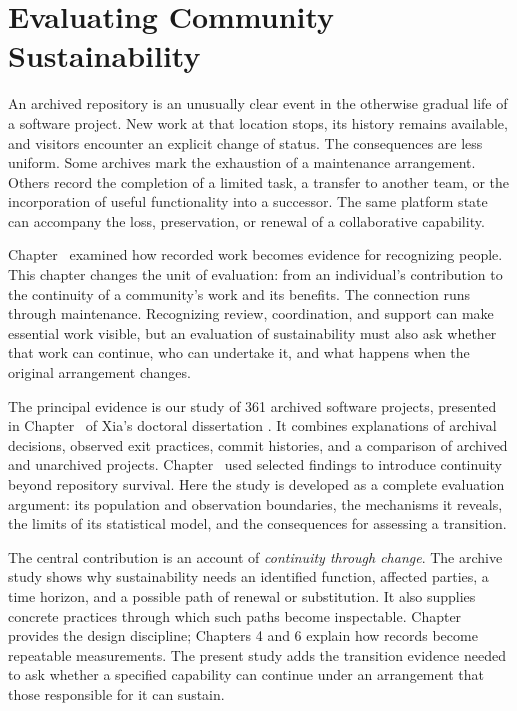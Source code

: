 \chapter{Evaluating Community Sustainability}
\label{ch:sustainability}

An archived repository is an unusually clear event in the otherwise gradual life of a software project. New work at that location stops, its history remains available, and visitors encounter an explicit change of status. The consequences are less uniform. Some archives mark the exhaustion of a maintenance arrangement. Others record the completion of a limited task, a transfer to another team, or the incorporation of useful functionality into a successor. The same platform state can accompany the loss, preservation, or renewal of a collaborative capability.

Chapter~ examined how recorded work becomes evidence for recognizing people. This chapter changes the unit of evaluation: from an individual's contribution to the continuity of a community's work and its benefits. The connection runs through maintenance. Recognizing review, coordination, and support can make essential work visible, but an evaluation of sustainability must also ask whether that work can continue, who can undertake it, and what happens when the original arrangement changes.

The principal evidence is our study of 361 archived software projects, presented in Chapter~ of Xia's doctoral dissertation \citep{xia2024thesis}. It combines explanations of archival decisions, observed exit practices, commit histories, and a comparison of archived and unarchived projects. Chapter~ used selected findings to introduce continuity beyond repository survival. Here the study is developed as a complete evaluation argument: its population and observation boundaries, the mechanisms it reveals, the limits of its statistical model, and the consequences for assessing a transition.

The central contribution is an account of \emph{continuity through change}. The archive study shows why sustainability needs an identified function, affected parties, a time horizon, and a possible path of renewal or substitution. It also supplies concrete practices through which such paths become inspectable. Chapter~ provides the design discipline; Chapters 4 and 6 explain how records become repeatable measurements. The present study adds the transition evidence needed to ask whether a specified capability can continue under an arrangement that those responsible for it can sustain.

